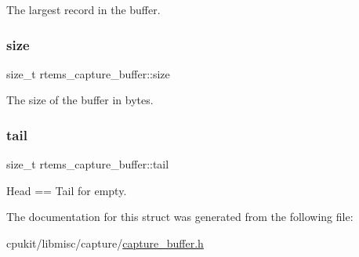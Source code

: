The largest record in the buffer. \mbox{\label{structrtems__capture__buffer_ada65e25ece7917227c92f82d63dae799}} 
\subsubsection{\texorpdfstring{size}{size}}
{\footnotesize\ttfamily size\+\_\+t rtems\+\_\+capture\+\_\+buffer\+::size}

The size of the buffer in bytes. \mbox{\label{structrtems__capture__buffer_a7a4c854264e8b007c79d5cc65dfc45a3}} 
\subsubsection{\texorpdfstring{tail}{tail}}
{\footnotesize\ttfamily size\+\_\+t rtems\+\_\+capture\+\_\+buffer\+::tail}

Head == Tail for empty. 

The documentation for this struct was generated from the following file\+:\begin{DoxyCompactItemize}
\item 
cpukit/libmisc/capture/\mbox{\hyperlink{capture__buffer_8h}{capture\+\_\+buffer.\+h}}\end{DoxyCompactItemize}
